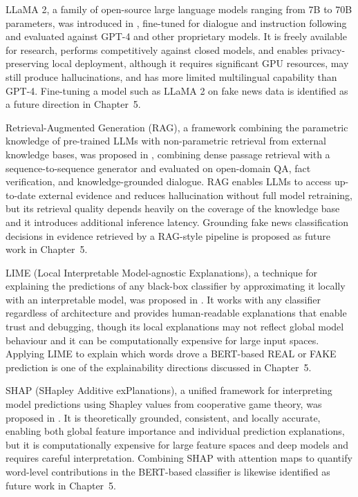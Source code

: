 LLaMA 2, a family of open-source large language models ranging from 7B to 70B parameters, was introduced in \citep{Touvron2023Llama2}, fine-tuned for dialogue and instruction following and evaluated against GPT-4 and other proprietary models. It is freely available for research, performs competitively against closed models, and enables privacy-preserving local deployment, although it requires significant GPU resources, may still produce hallucinations, and has more limited multilingual capability than GPT-4. Fine-tuning a model such as LLaMA 2 on fake news data is identified as a future direction in Chapter~5.

Retrieval-Augmented Generation (RAG), a framework combining the parametric knowledge of pre-trained LLMs with non-parametric retrieval from external knowledge bases, was proposed in \citep{Lewis2020RAG}, combining dense passage retrieval with a sequence-to-sequence generator and evaluated on open-domain QA, fact verification, and knowledge-grounded dialogue. RAG enables LLMs to access up-to-date external evidence and reduces hallucination without full model retraining, but its retrieval quality depends heavily on the coverage of the knowledge base and it introduces additional inference latency. Grounding fake news classification decisions in evidence retrieved by a RAG-style pipeline is proposed as future work in Chapter~5.

LIME (Local Interpretable Model-agnostic Explanations), a technique for explaining the predictions of any black-box classifier by approximating it locally with an interpretable model, was proposed in \citep{Ribeiro2016LIME}. It works with any classifier regardless of architecture and provides human-readable explanations that enable trust and debugging, though its local explanations may not reflect global model behaviour and it can be computationally expensive for large input spaces. Applying LIME to explain which words drove a BERT-based REAL or FAKE prediction is one of the explainability directions discussed in Chapter~5.

SHAP (SHapley Additive exPlanations), a unified framework for interpreting model predictions using Shapley values from cooperative game theory, was proposed in \citep{Lundberg2017SHAP}. It is theoretically grounded, consistent, and locally accurate, enabling both global feature importance and individual prediction explanations, but it is computationally expensive for large feature spaces and deep models and requires careful interpretation. Combining SHAP with attention maps to quantify word-level contributions in the BERT-based classifier is likewise identified as future work in Chapter~5.

